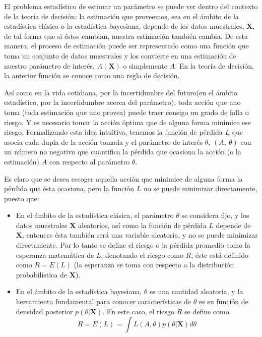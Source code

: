 \documentclass[10pt,openright]{book}\usepackage[]{graphicx}\usepackage[]{color}
\begin{document}
El problema estadístico de estimar un parámetro se puede ver dentro del contexto de la teoría de decisión: la estimación que proveemos, sea en el ámbito de la estadística clásica o la estadística bayesiana, depende de los datos muestrales, $\mathbf{X}$, de tal forma que si éstos cambian, nuestra estimación también cambia. De esta manera, el proceso de estimación puede ser representado como una función que toma un conjunto de datos muestrales y los convierte en una estimación de nuestro parámetro de interés, $A(\mathbf{X})$ o simplemente $A$. En la teoría de decisión, la anterior función se conoce como una regla de decisión.

Así como en la vida cotidiana, por la incertidumbre del futuro(en el ámbito estadístico, por la incertidumbre acerca del parámetro), toda acción que uno toma (toda estimación que uno provea) puede traer consigo un grado de falla o riesgo. Y es necesario tomar la acción óptima que de alguna forma minimice ese riesgo. Formalizando esta idea intuitiva, tenemos la función de pérdida $L$ que asocia cada dupla de la acción tomada y el parámetro de interés $\theta$, $(A, \ \theta)$ con un número no negativo que cuantifica la pérdida que ocasiona la acción (o la estimación) $A$ con respecto al parámetro $\theta$.

Es claro que se desea escoger aquella acción que minimice de alguna forma la pérdida que ésta ocasiona, pero la función $L$ no se puede minimizar directamente, puesto que:
\begin{itemize}
    \item En el ámbito de la estadística clásica, el parámetro $\theta$ se considera fijo, y los datos muestrales $\mathbf{X}$ aleatorios, así como la función de pérdida $L$ depende de $\mathbf{X}$, entonces ésta también será una variable aleatoria, y no se puede minimizar directamente. Por lo tanto se define el riesgo o la pérdida promedio como la esperanza matemática de $L$; denotando el riesgo como $R$, éste está definido como $R=E(L)$ (la esperanza se toma con respecto a la distribución probabilística de $\mathbf{X}$).
    \item En el ámbito de la estadística bayesiana, $\theta$ es una cantidad aleatoria, y la herramienta fundamental para conocer características de $\theta$ es su función de densidad posterior $p(\theta|\mathbf{X})$. En este caso, el riesgo $R$ se define como
        \begin{equation*}
        R=E(L)=\int L(A, \theta)p(\theta|\mathbf{X})d\theta
        \end{equation*}
\end{itemize}
\end{document}
